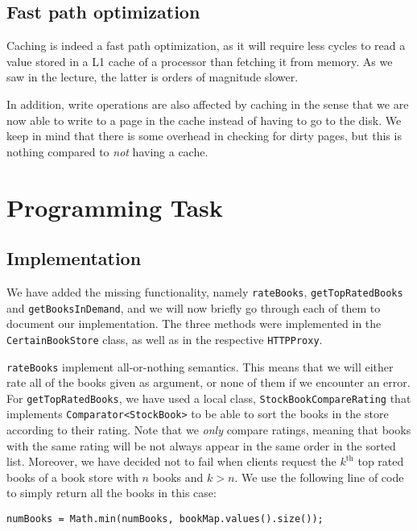 \documentclass[11pt]{article}
\begin{document}
\subsection*{Fast path optimization}

Caching is indeed a fast path optimization, as it will require less cycles to
read a value stored in a L1 cache of a processor than fetching it from memory.
As we saw in the lecture, the latter is orders of magnitude slower.

In addition, write operations are also affected by caching in the sense that
we are now able to write to a page in the cache instead of having to go to the
disk.
We keep in mind that there is some overhead in checking for dirty pages, but
this is nothing compared to \emph{not} having a cache.


\section*{Programming Task}

\subsection*{Implementation}
We have added the missing functionality, namely \texttt{rateBooks},
\texttt{getTopRatedBooks} and \texttt{getBooksInDemand}, and we will now briefly go through each of them to document our implementation.
The three methods were implemented in the \texttt{CertainBookStore} class, as
well as in the respective \texttt{HTTPProxy}.

\texttt{rateBooks} implement all-or-nothing semantics. This means that we will
either rate all of the books given as argument, or none of them if we encounter
an error.
For \texttt{getTopRatedBooks}, we have used a local class,
\texttt{StockBookCompareRating} that implements \texttt{Comparator<StockBook>}
to be able to sort the books in the store according to their rating. Note that
we \emph{only} compare ratings, meaning that books with the same rating will be
not always appear in the same order in the sorted list.
Moreover, we have decided not to fail when clients request the $k^{\text{th}}$
top rated books of a book store with $n$ books and $k>n$. We use the following
line of code to simply return all the books in this case:

\begin{center}
\texttt{numBooks = Math.min(numBooks, bookMap.values().size());}
\end{center}
\end{document}
